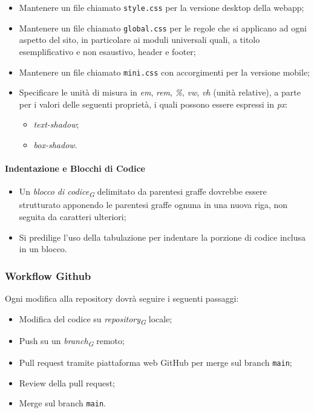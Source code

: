 \documentclass[a4paper, 12pt]{article}
\begin{document}
\begin{itemize}
    \item Mantenere un file chiamato \texttt{style.css} per la versione desktop della webapp;
    \item Mantenere un file chiamato \texttt{global.css} per le regole che si applicano ad ogni aspetto del sito, in particolare ai moduli universali quali, a titolo esemplificativo e non esaustivo, header e footer;
    \item Mantenere un file chiamato \texttt{mini.css} con accorgimenti per la versione mobile;
    \item Specificare le unità di misura in \textit{em}, \textit{rem}, \textit{\%}, \textit{vw}, \textit{vh} (unità relative), a parte per i valori delle seguenti proprietà, i quali possono essere espressi in \textit{px}:
    \begin{itemize}
        \item \textit{text-shadow};
        \item \textit{box-shadow}.
    \end{itemize}
\end{itemize}

\paragraph{Indentazione e Blocchi di Codice}
\begin{itemize}
    \item Un \textit{blocco di codice\textsubscript{G}} delimitato da parentesi graffe dovrebbe essere strutturato apponendo le parentesi graffe ognuna in una nuova riga, non seguita da caratteri ulteriori;
    \item Si predilige l'uso della tabulazione per indentare la porzione di codice inclusa in un blocco.
\end{itemize}

\subsubsection{Workflow Github}

Ogni modifica alla repository dovrà seguire i seguenti passaggi:
\begin{itemize}
\item Modifica del codice su \textit{repository\textsubscript{G}} locale;
\item Push su un \textit{branch\textsubscript{G}} remoto;
\item Pull request tramite piattaforma web GitHub per merge sul branch \texttt{main};
\item Review della pull request;
\item Merge sul branch \texttt{main}.
\end{itemize}
\end{document}
